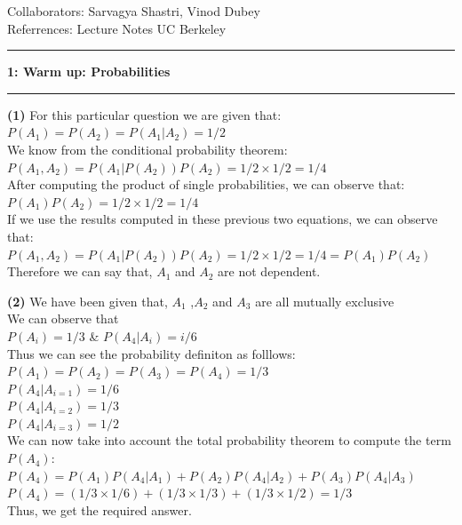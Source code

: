 \documentclass[11pt]{article}
\newcommand\question[2]{\vspace{.25in}\hrule\textbf{#1: #2}\vspace{.5em}\hrule\vspace{.10in}}
\renewcommand\part[1]{\vspace{.10in}\textbf{(#1)}}
\begin{document}
\raggedright
\newcommand\NAME{Aishwarya Asesh}  %
\newcommand\UID{u1063384}     %
\newcommand\HWNUM{6}              %


Collaborators: Sarvagya Shastri, Vinod Dubey\\
Referrences: Lecture Notes UC Berkeley\\

\question{1}{Warm up: Probabilities}
\part{1} 
For this particular question we are given that: \newline
$P(A_1) = P(A_2) = P(A_1 | A_2) = {1}/{2}$\\
We know from the conditional probability theorem:\\
$P(A_1 , A_2) = P(A_1 | P(A_2))P(A_2) = {1}/{2} \times {1}/{2} = {1}/{4}$\\
After computing the product of single probabilities, we can observe that:\\
$P(A_1)P(A_2) = {1}/{2} \times {1}/{2} = {1}/{4}$\\
If we use the results computed in these previous two equations, we can observe that:\\
$P(A_1 , A_2) = P(A_1 | P(A_2))P(A_2) = {1}/{2} \times {1}/{2} = {1}/{4} = P(A_1)P(A_2)$\\
Therefore we can say that, $A_1$ and $A_2$ are not dependent.

\part{2}
We have been given that, $A_1$ ,$A_2$ and $A_3$ are all mutually exclusive\\
We can observe that\\
$P(A_i) = {1}/{3}$ \& $P(A_4 | A_i) = {i}/{6}$\\ Thus we can see the probability definiton as folllows:\\
$P(A_1) = P(A_2) = P(A_3) = P(A_4) = {1}/{3}$\\
$P(A_4|A_{i=1}) = {1}/{6}$\\
$P(A_4|A_{i=2}) = {1}/{3}$\\
$P(A_4|A_{i=3}) = {1}/{2}$\\
We can now take into account the total probability theorem to compute the term $P(A_4)$:\\  
$P(A_4) = P(A_1)P(A_4|A_1) + P(A_2)P(A_4|A_2) + P(A_3)P(A_4|A_3)$\\
$P(A_4) = ({1}/{3}\times {1}/{6}) + ({1}/{3} \times {1}/{3}) + ({1}/{3}\times {1}/{2}) = {1}/{3}$\\
Thus, we get the required answer.\\
\end{document}
